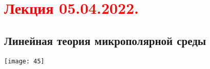 \documentclass[main.tex]{subfiles}
\begin{document}
\section{\textcolor{red}{Лекция 05.04.2022.}}

\subsection{Линейная теория микрополярной среды}
\texttt{[image: 45]}



\end{document}
